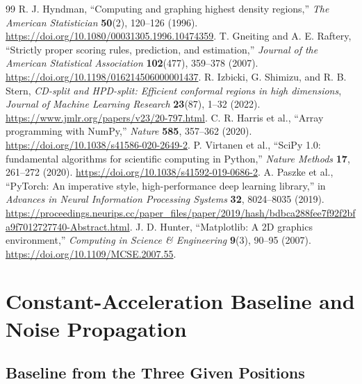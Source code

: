 \documentclass[11pt,a4paper]{article}
\begin{document}
\begin{thebibliography}{99}
 R. J. Hyndman, ``Computing and graphing highest density regions,'' \emph{The American Statistician} \textbf{50}(2), 120--126 (1996). \url{https://doi.org/10.1080/00031305.1996.10474359}.
 T. Gneiting and A. E. Raftery, ``Strictly proper scoring rules, prediction, and estimation,'' \emph{Journal of the American Statistical Association} \textbf{102}(477), 359--378 (2007). \url{https://doi.org/10.1198/016214506000001437}.
 R. Izbicki, G. Shimizu, and R. B. Stern, \emph{CD-split and HPD-split: Efficient conformal regions in high dimensions}, \emph{Journal of Machine Learning Research} \textbf{23}(87), 1--32 (2022). \url{https://www.jmlr.org/papers/v23/20-797.html}.
 C. R. Harris et al., ``Array programming with NumPy,'' \emph{Nature} \textbf{585}, 357--362 (2020). \url{https://doi.org/10.1038/s41586-020-2649-2}.
 P. Virtanen et al., ``SciPy 1.0: fundamental algorithms for scientific computing in Python,'' \emph{Nature Methods} \textbf{17}, 261--272 (2020). \url{https://doi.org/10.1038/s41592-019-0686-2}.
 A. Paszke et al., ``PyTorch: An imperative style, high-performance deep learning library,'' in \emph{Advances in Neural Information Processing Systems} \textbf{32}, 8024--8035 (2019). \url{https://proceedings.neurips.cc/paper_files/paper/2019/hash/bdbca288fee7f92f2bfa9f7012727740-Abstract.html}.
 J. D. Hunter, ``Matplotlib: A 2D graphics environment,'' \emph{Computing in Science \& Engineering} \textbf{9}(3), 90--95 (2007). \url{https://doi.org/10.1109/MCSE.2007.55}.
\end{thebibliography}

\appendix
\section{Constant-Acceleration Baseline and Noise Propagation}
\label{app:noise}

\subsection{Baseline from the Three Given Positions}
\end{document}
